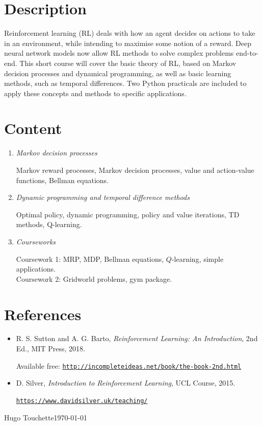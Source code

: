 \documentclass[11pt,a4paper]{article}
\begin{document}
\section{Description}

Reinforcement learning (RL) deals with how an agent decides on actions to take in an environment, while intending to maximise some notion of a reward. Deep neural network models now allow RL methods to solve complex problems end-to-end. This short course will cover the basic theory of RL, based on Markov decision processes and dynamical programming, as well as basic learning methods, such as temporal differences. Two Python practicals are included to apply these concepts and methods to specific applications.
\section{Content}

\begin{enumerate}
\renewcommand{\theenumi}{\textbf{\arabic{enumi}}}
\item \emph{Markov decision processes}

Markov reward processes, Markov decision processes, value and action-value functions, Bellman equations.

\item \emph{Dynamic programming and temporal difference methods}

Optimal policy, dynamic programming, policy and value iterations, TD methods, Q-learning.

\item \emph{Courseworks}

Coursework 1: MRP, MDP, Bellman equations, $Q$-learning, simple applications.\\
Coursework 2: Gridworld problems, gym package. 

\end{enumerate}

\section{References}

\begin{itemize}
\item R. S. Sutton and A. G. Barto, \textit{Reinforcement Learning: An Introduction}, 2nd Ed., MIT Press, 2018. 

Available free: \href{http://incompleteideas.net/book/the-book-2nd.html}{\texttt{http://incompleteideas.net/book/the-book-2nd.html}}
 
\item D. Silver, \textit{Introduction to Reinforcement Learning}, UCL Course, 2015.

\href{https://www.davidsilver.uk/teaching/}{\texttt{https://www.davidsilver.uk/teaching/}}
\end{itemize}

\vfill
Hugo Touchette\hfill \today~\currenttime
\end{document}
